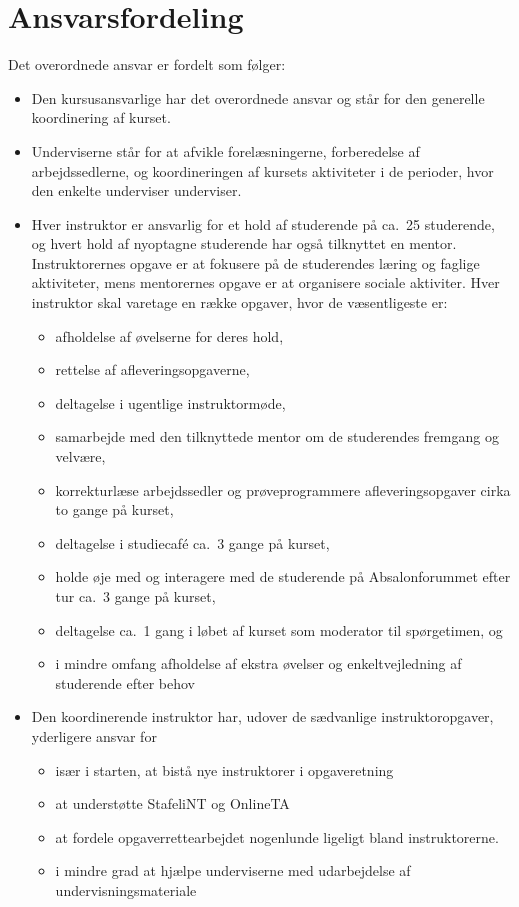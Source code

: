\documentclass[a4paper]{article}
\begin{document}
\section{Ansvarsfordeling}
Det overordnede ansvar er fordelt som følger:
\begin{itemize}
\item Den kursusansvarlige har det overordnede ansvar og står for den
  generelle koordinering af kurset.
\item Underviserne står for at afvikle forelæsningerne, forberedelse
  af arbejdssedlerne, og koordineringen af kursets aktiviteter i de
  perioder, hvor den enkelte underviser underviser.
\item Hver instruktor er ansvarlig for et hold af studerende på ca.\ 25
  studerende, og hvert hold af nyoptagne studerende har også
  tilknyttet en mentor. Instruktorernes opgave er at fokusere på de
  studerendes læring og faglige aktiviteter, mens mentorernes opgave
  er at organisere sociale aktiviter. Hver instruktor skal varetage en
  række opgaver, hvor de væsentligeste er:
  \begin{itemize}
  \item afholdelse af øvelserne for deres hold,
  \item rettelse af afleveringsopgaverne,
  \item deltagelse i ugentlige instruktormøde,
  \item samarbejde med den tilknyttede mentor om de studerendes
    fremgang og velvære,
  \item korrekturlæse arbejdssedler og prøveprogrammere
    afleveringsopgaver cirka to gange på kurset,
  \item deltagelse i studiecaf{\'e} ca.\ 3 gange på kurset,
  \item holde øje med og interagere med de studerende på
    Absalonforummet efter tur ca.\ 3 gange på kurset,
  \item deltagelse ca.\ 1 gang i løbet af kurset som moderator til
    spørgetimen, og
  \item i mindre omfang afholdelse af ekstra øvelser og enkeltvejledning af
    studerende efter behov
  \end{itemize}
\item Den koordinerende instruktor har, udover de sædvanlige
  instruktoropgaver, yderligere ansvar for
  \begin{itemize}
    \item især i starten, at bistå nye instruktorer i opgaveretning
    \item at understøtte StafeliNT og OnlineTA
    \item at fordele opgaverrettearbejdet nogenlunde ligeligt bland
      instruktorerne.
    \item i mindre grad at hjælpe underviserne med udarbejdelse af
      undervisningsmateriale
  \end{itemize}
\end{itemize}
\end{document}
